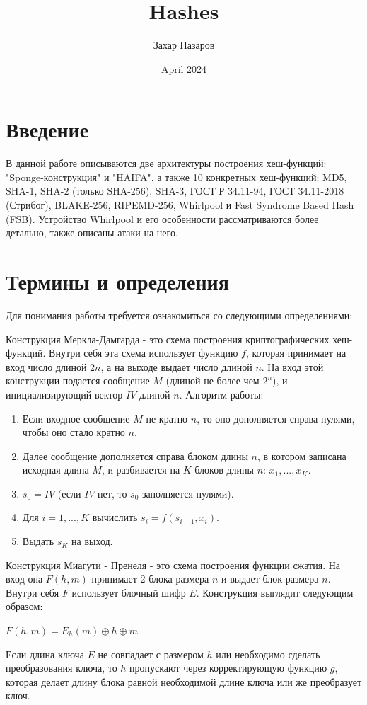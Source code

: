 \documentclass[colorthm]{./civarticle}
\title{Hashes}
\author{Захар Назаров}
\date{April 2024}
\begin{document}
\section{Введение}
В данной работе описываются две архитектуры построения хеш-функций: "Sponge-конструкция" и "HAIFA", а также 10 конкретных хеш-функций: MD5, SHA-1, SHA-2 (только SHA-256), SHA-3, ГОСТ Р 34.11-94, ГОСТ 34.11-2018 (Стрибог), BLAKE-256, RIPEMD-256, Whirlpool и Fast Syndrome Based Hash (FSB). Устройство Whirlpool и его особенности рассматриваются более детально, также описаны атаки на него.


\section{Термины и определения}

Для понимания работы требуется ознакомиться со следующими определениями:

\begin{definition}
    Конструкция Меркла-Дамгарда - это схема построения криптографических хеш-функций. Внутри себя эта схема использует функцию $f$, которая принимает на вход число длиной $2n$, а на выходе выдает число длиной $n$. На вход этой конструкции подается сообщение $M$ (длиной не более чем $2^n$), и инициализирующий вектор $IV$ длиной $n$. Алгоритм работы:

    \begin{enumerate}
        \item Если входное сообщение $M$ не кратно $n$, то оно дополняется справа нулями, чтобы оно стало кратно $n$. 
        \item Далее сообщение дополняется справа блоком длины $n$, в котором записана исходная длина $M$, и разбивается на $K$ блоков длины $n$: $x_1, ..., x_K$.
        \item $s_0 = IV$ (если $IV$ нет, то $s_0$ заполняется нулями).
        \item Для $i = 1, ..., K$ вычислить $s_i = f(s_{i-1}, x_i)$.
        \item Выдать $s_K$ на выход.
    \end{enumerate}
\end{definition}

\begin{definition}
    Конструкция Миагути - Пренеля - это схема построения функции сжатия. На вход она $F(h,m)$ принимает 2 блока размера $n$ и выдает блок размера $n$. Внутри себя $F$ использует блочный шифр $E$. Конструкция выглядит следующим образом:

    $F(h, m) = E_h(m) \oplus h \oplus m$

    Если длина ключа $E$ не совпадает с размером $h$ или необходимо сделать преобразования ключа, то $h$ пропускают через корректирующую  функцию $g$, которая делает длину блока равной необходимой длине ключа или же преобразует ключ.
\end{definition}
\end{document}
